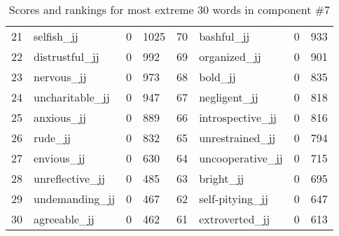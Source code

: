 \begin{table}[tbp]
\begin{tabular}{| rlr@{.}l | rlr@{.}l |}
    21 & selfish\_jj & 0 & 1025    &    70 & bashful\_jj & 0 & 933 \\
    22 & distrustful\_jj & 0 & 992    &    69 & organized\_jj & 0 & 901 \\
    23 & nervous\_jj & 0 & 973    &    68 & bold\_jj & 0 & 835 \\
    24 & uncharitable\_jj & 0 & 947    &    67 & negligent\_jj & 0 & 818 \\
    25 & anxious\_jj & 0 & 889    &    66 & introspective\_jj & 0 & 816 \\
    26 & rude\_jj & 0 & 832    &    65 & unrestrained\_jj & 0 & 794 \\
    27 & envious\_jj & 0 & 630    &    64 & uncooperative\_jj & 0 & 715 \\
    28 & unreflective\_jj & 0 & 485    &    63 & bright\_jj & 0 & 695 \\
    29 & undemanding\_jj & 0 & 467    &    62 & self-pitying\_jj & 0 & 647 \\
    30 & agreeable\_jj & 0 & 462    &    61 & extroverted\_jj & 0 & 613 \\
    \hline
    \end{tabular}
    \caption{Scores and rankings for most extreme 30 words in component \#7} 
\end{table}
\clearpage
